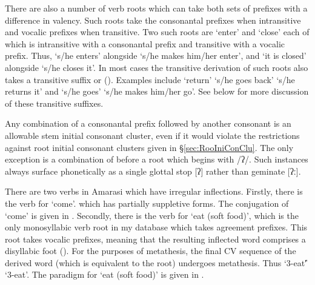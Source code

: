 There are also a number of verb roots which can take both
sets of prefixes with a difference in valency.
Such roots take the consonantal prefixes when
intransitive and vocalic prefixes when transitive.
Two such roots are  `enter' and  `close'
each of which is intransitive with a consonantal prefix
and transitive with a vocalic prefix.
Thus,  `s/he enters' alongside  `s/he makes him/her enter',
and  `it is closed' alongside  `s/he closes it'.
In most cases the transitive derivation of such roots also 
takes a transitive suffix  or  ().
Examples include  `return' {\ra} 
`s/he goes back' {\ra}  `s/he returns it'
and  {\ra}  `s/he goes' {\ra}  `s/he makes him/her go'.
See  below for more discussion of these transitive suffixes.

Any combination of a consonantal prefix followed by another consonant is an allowable stem initial consonant cluster,
even if it would violate the restrictions against root initial consonant clusters given in {\S}\ref{sec:RooIniConClu}.
The only exception is a combination of  before a root which begins with /ʔ/.
Such instances always surface phonetically as a single glottal stop [ʔ] rather than geminate [ʔː].

There are two verbs in Amarasi which have irregular inflections.
Firstly, there is the verb for `come'.
which has partially suppletive forms.
The conjugation of `come' is given in .
Secondly, there is the verb for `eat (soft food)',
which is the only monosyllabic verb root in my
database which takes agreement prefixes.
This root takes vocalic prefixes, meaning that the resulting
inflected word comprises a disyllabic foot ().
For the purposes of metathesis, the final CV sequence of the derived
word (which is equivalent to the root) undergoes metathesis.
Thus  `3-eat\U' {\ra}  `3-eat\M'.
The paradigm for  `eat (soft food)' is given in .

